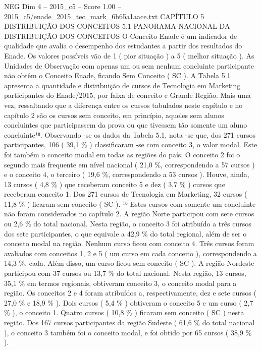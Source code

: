 \begin{textsample}{NEG Dim 4 – 2015\_c5 – Score 1.00 – 2015\_c5/enade\_2015\_tec\_mark\_6b65a1aace.txt}  \label{ex:f4_neg_185}
CAPÍTULO 5 DISTRIBUIÇÃO DOS CONCEITOS 5.1 PANORAMA NACIONAL DA DISTRIBUIÇÃO DOS CONCEITOS O Conceito Enade é um indicador de qualidade que avalia o desempenho dos estudantes a partir dos resultados do Enade.
Os valores possíveis vão de 1 ( pior situação ) a 5 ( melhor situação ).
As Unidades de Observação com apenas um ou sem nenhum concluinte participante não obtêm o Conceito Enade, ficando Sem Conceito ( SC ).
A Tabela 5.1 apresenta a quantidade e distribuição de cursos de Tecnologia em Marketing participantes do Enade/2015, por faixa de conceito e Grande Região.
Mais uma vez, ressaltando que a diferença entre os cursos tabulados neste capítulo e no capítulo 2 são os cursos sem conceito, em princípio, aqueles sem alunos concluintes que participassem da prova ou que tivessem tão somente um aluno concluinte¹⁸.
Observando -se os dados da Tabela 5.1, nota -se que, dos 271 cursos participantes, 106 ( 39,1 \% ) classificaram -se com conceito 3, o valor modal.
Este foi também o conceito modal em todas as regiões do país.
O conceito 2 foi o segundo mais frequente em nível nacional ( 21,0 \%, correspondendo a 57 cursos ) e o conceito 4, o terceiro ( 19,6 \%, correspondendo a 53 cursos ).
Houve, ainda, 13 cursos ( 4,8 \% ) que receberam conceito 5 e dez ( 3,7 \% ) cursos que receberam conceito 1.
Dos 271 cursos de Tecnologia em Marketing, 32 cursos ( 11,8 \% ) ficaram sem conceito ( SC ). ¹⁸ Estes cursos com somente um concluinte não foram considerados no capítulo 2.
A região Norte participou com sete cursos ou 2,6 \% do total nacional.
Nesta região, o conceito 3 foi atribuído a três cursos dos sete participantes, o que equivale a 42,9 \% do total regional, além de ser o conceito modal na região.
Nenhum curso ficou com conceito 4.
Três cursos foram avaliados com conceitos 1, 2 e 5 ( um curso em cada conceito ), correspondendo a 14,3 \%, cada.
Além disso, um curso ficou sem conceito ( SC ).
A região Nordeste participou com 37 cursos ou 13,7 \% do total nacional.
Nesta região, 13 cursos, 35,1 \% em termos regionais, obtiveram conceito 3, o conceito modal para a região.
Os conceitos 2 e 4 foram atribuídos a, respectivamente, dez e sete cursos ( 27,0 \% e 18,9 \% ).
Dois cursos ( 5,4 \% ) obtiveram o conceito 5 e um curso ( 2,7 \% ), o conceito 1.
Quatro cursos ( 10,8 \% ) ficaram sem conceito ( SC ) nesta região.
Dos 167 cursos participantes da região Sudeste ( 61,6 \% do total nacional ), o conceito 3 também foi o conceito modal, e foi obtido por 65 cursos ( 38,9 \% ).

\end{textsample}
